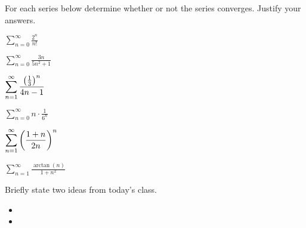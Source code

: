 \begin{problem}
  \clearpage

  \item For each series below determine whether or not the series converges. Justify your answers.

  \begin{subproblem}
  \item $\displaystyle \sum^\infty_{n=0} \frac{2^n}{n!}$
    \vfill
  \item $\displaystyle \sum^\infty_{n=0} \frac{3n}{5n^2+1}$
    \vfill
  \item $\displaystyle \sum^\infty_{n=1} \frac{\left(\frac{1}{3}\right)^n}{4n-1}$
    \vfill
    \clearpage
  \item $\displaystyle \sum^\infty_{n=0} n\cdot\frac{1}{6^n}$
    \vfill
  \item $\displaystyle \sum^\infty_{n=1} \left(\frac{1+n}{2n}\right)^n$
    \vfill
  \item $\displaystyle \sum^\infty_{n=1} \frac{\arctan(n)}{1+n^2}$
    \vfill
  \end{subproblem}

\end{problem}

\postClass

\begin{problem}
\item Briefly state two ideas from today's class.
  \begin{itemize}
  \item
  \item
  \end{itemize}
\item
  \begin{subproblem}
    \item
  \end{subproblem}
\end{problem}



